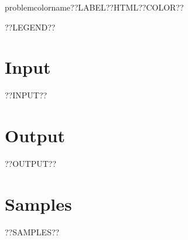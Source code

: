 \renewcommand\problemlabel{??LABEL??}
\renewcommand\problemcolor{??COLOR??}
\renewcommand\problemtitle{??TITLE??}
\renewcommand\timelimit{??TIMELIMIT??}
\renewcommand\memorylimit{??MEMORYLIMIT??}

\renewcommand\problemcolorname{problemcolorname\problemlabel}
\definecolor\problemcolorname{HTML}{\problemcolor}

\pagestyle{problem}

\problemheader

??LEGEND??

\section*{Input}
??INPUT??

\section*{Output}
??OUTPUT??

\section*{Samples}
??SAMPLES??
